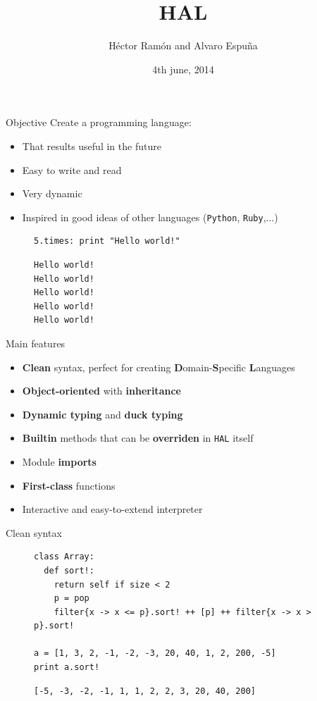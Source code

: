 \documentclass{beamer}
\title{HAL}
\author{Héctor Ramón and Alvaro Espuña}
\date{4th june, 2014}
\begin{document}
\frame{\titlepage}
\begin{frame}[fragile]{Objective}
Create a programming language:
\begin{itemize}
\item
That results useful in the future
\item
Easy to write and read
\item
Very dynamic
\item
Inspired in good ideas of other languages (\texttt{Python}, \texttt{Ruby},...)
\end{itemize}
\begin{figure}[h!]
\begin{lstlisting}[language=hal]
5.times: print "Hello world!"
\end{lstlisting}
\begin{lstlisting}[language=output]
Hello world!
Hello world!
Hello world!
Hello world!
Hello world!
\end{lstlisting}
\label{hello5}
\end{figure}
\end{frame}
\begin{frame}{Main features}
\begin{itemize}
\item
\textbf{Clean} syntax, perfect for creating \textbf{D}omain-\textbf{S}pecific \textbf{L}anguages
\item
\textbf{Object-oriented} with \textbf{inheritance}
\item
\textbf{Dynamic typing} and \textbf{duck typing}
\item
\textbf{Builtin} methods that can be \textbf{overriden} in \texttt{HAL} itself
\item
Module \textbf{imports}
\item
\textbf{First-class} functions
\item
Interactive and easy-to-extend interpreter
\end{itemize}
\end{frame}
\begin{frame}[fragile]{Clean syntax}
\begin{figure}[h!]
\begin{lstlisting}[language=hal]
class Array:
  def sort!:
    return self if size < 2
    p = pop
    filter{x -> x <= p}.sort! ++ [p] ++ filter{x -> x > p}.sort!

a = [1, 3, 2, -1, -2, -3, 20, 40, 1, 2, 200, -5]
print a.sort!
\end{lstlisting}
\begin{lstlisting}[language=output]
[-5, -3, -2, -1, 1, 1, 2, 2, 3, 20, 40, 200]
\end{lstlisting}
\label{quicksort}
\end{figure}
\end{frame}
\end{document}
